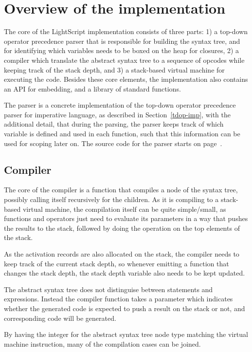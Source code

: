 \documentclass[11pt]{report}
\begin{document}
\section{Overview of the implementation}
The core of the LightScript implementation consists of three parts: 1) a top-down operator precedence parser that is responsible for building the syntax tree, and for identifying which variables needs to be boxed on the heap for closures, 2) a compiler which translate the abstract syntax tree to a sequence of opcodes while keeping track of the stack depth, and 3) a stack-based virtual machine for executing the code.
Besides these core elements, the implementation also contains an API for embedding, and a library of standard functions.

The parser is a concrete implementation of the top-down operator precedence parser for imperative language, as described in Section~\ref{tdop-imp}, with the additional detail, that during the parsing, the parser keeps track of which variable is defined and used in each function, such that this information can be used for scoping later on. 
The source code for the parser starts on page~\pageref{code-lightscript-parser}.

\subsection{Compiler}

The core of the compiler is a function that compiles a node of the syntax tree, possibly calling itself recursively for the children.
As it is compiling to a stack-based virtual machine, the compilation itself can be quite simple/small, as functions and operators just need to evaluate its parameters in a way that pushes the results to the stack, followed by doing the operation on the top elements of the stack.

As the activation records are also allocated on the stack, the compiler needs to keep track of the current stack depth, so whenever emitting a function that changes the stack depth, the stack depth variable also needs to be kept updated.

The abstract syntax tree does not distinguise between statements and expressions. Instead the compiler function takes a parameter which indicates whether the generated code is expected to push a result on the stack or not, and corresponding code will be generated. 

By having the integer for the abstract syntax tree node type matching the virtual machine instruction, many of the compilation cases can be joined.
\end{document}
